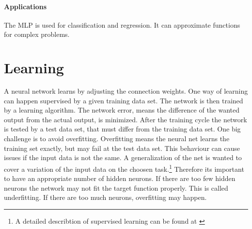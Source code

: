 \documentclass[10pt,a4paper,DIV=11]{scrreprt}
\begin{document}
\paragraph*{Applications}

The MLP is used for classification and  regression. It can approximate functions for complex problems.





\section{Learning}
A neural network learns by adjusting the connection weights.
One way of learning can happen supervised by a given training data set. The network is then trained by a learning algorithm. The network error, means the difference of the wanted output from the actual output, is minimized. After the training cycle the network is tested by a test data set, that must differ from the training data set. One big challenge is to avoid overfitting. Overfitting means the neural net learns the training set exactly, but may fail at the test data set. This behaviour can cause issues if the input data is not the same. A generalization of the net is wanted to cover a variation of the input data on the choosen task.\footnote{A detailed describtion of supervised learning can be found at \cite{Jona}} Therefore its important to have an appropriate number of hidden neurons. If there are too few hidden neurons the network may not fit the target function properly. This is called underfitting. If there are too much neurons, overfitting may happen.\\
\end{document}
